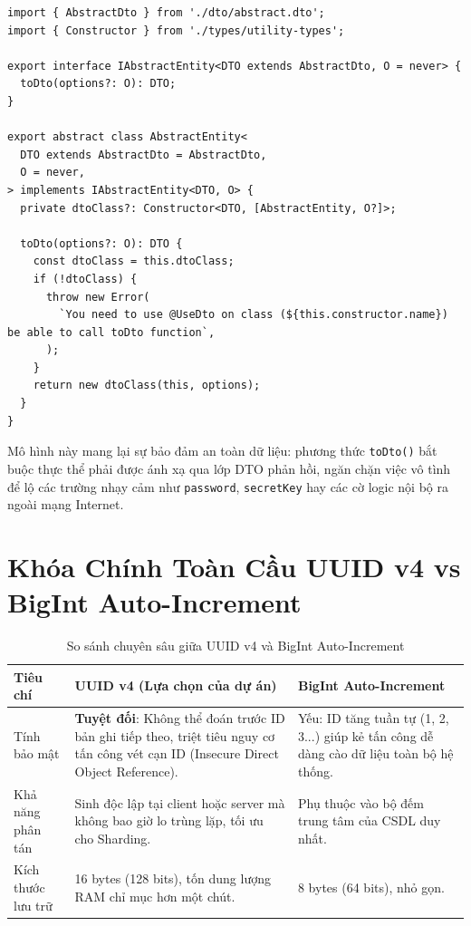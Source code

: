 \documentclass[12pt,a4paper,oneside]{book}
\begin{document}
\begin{codebox}
\begin{Verbatim}[fontsize=\small]
import { AbstractDto } from './dto/abstract.dto';
import { Constructor } from './types/utility-types';

export interface IAbstractEntity<DTO extends AbstractDto, O = never> {
  toDto(options?: O): DTO;
}

export abstract class AbstractEntity<
  DTO extends AbstractDto = AbstractDto,
  O = never,
> implements IAbstractEntity<DTO, O> {
  private dtoClass?: Constructor<DTO, [AbstractEntity, O?]>;

  toDto(options?: O): DTO {
    const dtoClass = this.dtoClass;
    if (!dtoClass) {
      throw new Error(
        `You need to use @UseDto on class (${this.constructor.name}) be able to call toDto function`,
      );
    }
    return new dtoClass(this, options);
  }
}
\end{Verbatim}
\end{codebox}

Mô hình này mang lại sự bảo đảm an toàn dữ liệu: phương thức \texttt{toDto()} bắt buộc thực thể phải được ánh xạ qua lớp DTO phản hồi, ngăn chặn việc vô tình để lộ các trường nhạy cảm như \texttt{password}, \texttt{secretKey} hay các cờ logic nội bộ ra ngoài mạng Internet.

\section{Khóa Chính Toàn Cầu UUID v4 vs BigInt Auto-Increment}

\begin{table}[htbp]
  \centering
  \small
  \caption{So sánh chuyên sâu giữa UUID v4 và BigInt Auto-Increment}
  \label{tab:uuid-vs-bigint}
  \begin{tabularx}{\textwidth}{l p{4.5cm} X}
    \toprule
    \textbf{Tiêu chí} & \textbf{UUID v4 (Lựa chọn của dự án)} & \textbf{BigInt Auto-Increment} \\
    \midrule
    Tính bảo mật & \textbf{Tuyệt đối}: Không thể đoán trước ID bản ghi tiếp theo, triệt tiêu nguy cơ tấn công vét cạn ID (Insecure Direct Object Reference). & Yếu: ID tăng tuần tự (1, 2, 3...) giúp kẻ tấn công dễ dàng cào dữ liệu toàn bộ hệ thống. \\
    Khả năng phân tán & Sinh độc lập tại client hoặc server mà không bao giờ lo trùng lặp, tối ưu cho Sharding. & Phụ thuộc vào bộ đếm trung tâm của CSDL duy nhất. \\
    Kích thước lưu trữ & 16 bytes (128 bits), tốn dung lượng RAM chỉ mục hơn một chút. & 8 bytes (64 bits), nhỏ gọn. \\
    \bottomrule
  \end{tabularx}
\end{table}
\end{document}
